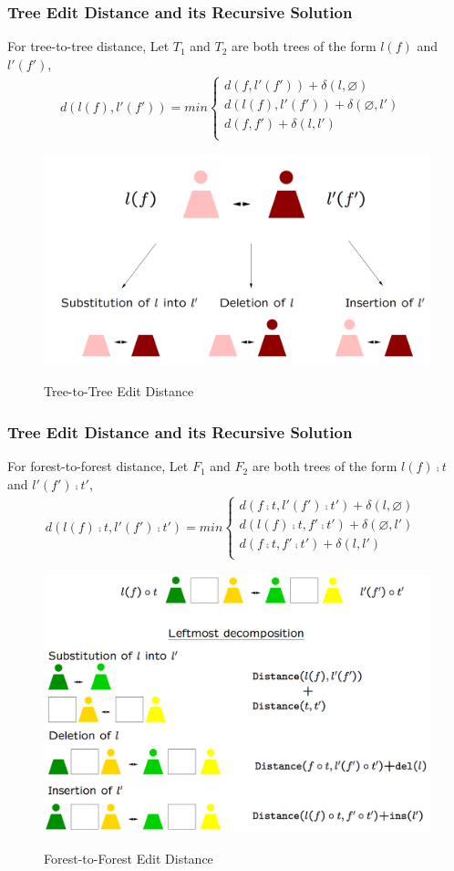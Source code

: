 \documentclass{beamer}
\begin{document}
\begin{frame}
\frametitle{Tree Edit Distance and its Recursive Solution}
For tree-to-tree distance,
Let $T_1$ and $T_2$ are both trees of the form $l(f)$ and $l'(f')$, 
\begin{align*}
d(l(f), l'(f')) = min \begin{cases}
	  	d(f, l'(f')) + \delta(l, \varnothing) \\ 
      	d(l(f), l'(f')) + \delta(\varnothing, l') \\ 
    	d(f, f') + \delta(l, l') & \\
    \end{cases}
\end{align*}
\begin{figure}
	\includegraphics[width=0.6\linewidth]{TreeToTree}
	\label{Tree-to-Tree Edit Distance} 
	\caption{Tree-to-Tree Edit Distance}
	\centering
\end{figure}
\end{frame}
\begin{frame}
\frametitle{Tree Edit Distance and its Recursive Solution}
For forest-to-forest distance,
Let $F_1$ and $F_2$ are both trees of the form $l(f) \comp t$ and $l'(f') \comp t'$, 
\begin{align*}
d(l(f) \comp t, l'(f') \comp t') = min \begin{cases}
	  	d(f \comp t, l'(f') \comp t') + \delta(l, \varnothing) \\ 
      	d(l(f) \comp t, f' \comp t') + \delta(\varnothing, l') \\ 
    	d(f \comp t, f' \comp t') + \delta(l, l') & \\
    \end{cases}
\end{align*}
\begin{figure}
	\includegraphics[width=0.6\linewidth]{ForestLeftmostDecomposition}
	\label{Forest-to-Forest Edit Distance} 
	\caption{Forest-to-Forest Edit Distance}
	\centering
\end{figure}
\end{frame}
\end{document}
